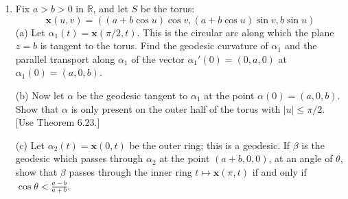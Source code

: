 \documentclass[leqno]{book}
\begin{document}
\begin{enumerate}
(c) For sufficiently small $r>0$, one can take the curve $t\mapsto\exp_p(r\cos t,r\sin t)$, which is a circle in the Euclidean coordinates.  This is called the \textbf{geodesic circle} of radius $r$ centered at $p$.  Show that its radii (i.e., the images of the Euclidean radii of $(r\cos t,r\sin t)$, which are geodesics) are orthogonal to the circle on $S$.  This was first stated by Gauss.  [Define $\varphi(r,\theta)=\exp_p(r\cos\theta,r\sin\theta)$.  By normality of the coordinates, $\frac{\partial^2\varphi}{\partial r^2}=0$.  Furthermore, $\|\frac{\partial\varphi}{\partial r}\|^2=1$ throughout; differentiating with respect to $\theta$ entails $\frac{\partial\varphi}{\partial r}\cdot\frac{\partial^2\varphi}{\partial r\partial\theta}=0$.  Use this to show that $\frac{\partial\varphi}{\partial r}\cdot\frac{\partial\varphi}{\partial\theta}$ is independent of $r$.  To see why that dot product is zero, take the limit as $r\to 0$ and note the conformality of the chart at the origin.]

If $S$ is a Lie group $G$ such that the translations $x\mapsto gx$ and $x\mapsto xg$ ($g\in G$) are isometries, it can be shown that Lie group homomorphisms $\mathbb R\to G$ are precisely geodesics sending $0\mapsto 1\in G$, and that this exponential map at $1$ coincides with the map of Exercise 5(h) of the previous section.  In this case, $\exp_1$ is defined on the \emph{whole} tangent plane, unlike the general case of regular surfaces (or, Riemannian manifolds).  However, this is harder to prove.

\item Fix $a>b>0$ in $\mathbb R$, and let $S$ be the torus:
$$\mathbf x(u,v)=((a+b\cos u)\cos v,(a+b\cos u)\sin v,b\sin u)$$
(a) Let $\alpha_1(t)=\mathbf x(\pi/2,t)$.  This is the circular arc along which the plane $z=b$ is tangent to the torus.  Find the geodesic curvature of $\alpha_1$ and the parallel transport along $\alpha_1$ of the vector $\alpha_1'(0)=(0,a,0)$ at $\alpha_1(0)=(a,0,b)$.

(b) Now let $\alpha$ be the geodesic tangent to $\alpha_1$ at the point $\alpha(0)=(a,0,b)$.  Show that $\alpha$ is only present on the outer half of the torus with $|u|\leqslant\pi/2$.  [Use Theorem 6.23.]

(c) Let $\alpha_2(t)=\mathbf x(0,t)$ be the outer ring; this is a geodesic.  If $\beta$ is the geodesic which passes through $\alpha_2$ at the point $(a+b,0,0)$, at an angle of $\theta$, show that $\beta$ passes through the inner ring $t\mapsto\mathbf x(\pi,t)$ if and only if $\cos\theta<\frac{a-b}{a+b}$.


\end{enumerate}
\end{document}
